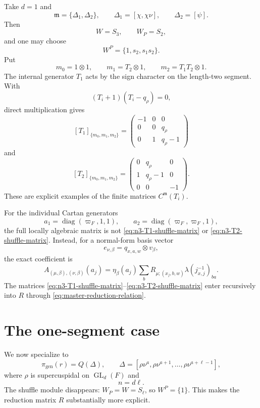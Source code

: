 \documentclass[12pt]{article}
\theoremstyle{definition}
\theoremstyle{remark}
\DeclareMathOperator{\GL}{GL}
\begin{document}
Take \(d=1\) and
\[
 \mathfrak m=\{\Delta_1,\Delta_2\},
 \qquad
 \Delta_1=[\chi,\chi\nu],
 \qquad
 \Delta_2=[\psi].
\]
Then
\[
 W=S_3,
 \qquad
 W_P=S_2,
\]
and one may choose
\[
 W^P=\{1,s_2,s_1s_2\}.
\]
Put
\[
 m_0=1\otimes1,
 \qquad
 m_1=T_2\otimes1,
 \qquad
 m_2=T_1T_2\otimes1.
\]
The internal generator \(T_1\) acts by the sign character on the length-two
segment.  With
\[
 (T_i+1)(T_i-q_\rho)=0,
\]
direct multiplication gives
\begin{equation}\label{eq:n3-T1-shuffle-matrix}
 [T_1]_{\{m_0,m_1,m_2\}}
 =
 \begin{pmatrix}
 -1&0&0\\
 0&0&q_\rho\\
 0&1&q_\rho-1
 \end{pmatrix}
\end{equation}
and
\begin{equation}\label{eq:n3-T2-shuffle-matrix}
 [T_2]_{\{m_0,m_1,m_2\}}
 =
 \begin{pmatrix}
 0&q_\rho&0\\
 1&q_\rho-1&0\\
 0&0&-1
 \end{pmatrix}.
\end{equation}
These are explicit examples of the finite matrices
\(C^{\mathfrak m}(T_i)\).

For the individual Cartan generators
\[
 a_1=\operatorname{diag}(\varpi_F,1,1),
 \qquad
 a_2=\operatorname{diag}(\varpi_F,\varpi_F,1),
\]
the full locally algebraic matrix is not
\eqref{eq:n3-T1-shuffle-matrix} or \eqref{eq:n3-T2-shuffle-matrix}.
Instead, for a normal-form basis vector
\[
 e_{\nu,\beta}
 =
 q_{x,a,w}\otimes v_\beta,
\]
the exact coefficient is
\begin{equation}\label{eq:n3-multisegment-exact-A}
 A_{(\mu,\beta),(\nu,\beta)}(a_j)
 =
 \eta_\beta(a_j)
 \sum_b
 R_{\mu;(x_j,b,w)}
 \lambda(j_{x,j}^{-1})_{ba}.
\end{equation}
The matrices \eqref{eq:n3-T1-shuffle-matrix}--\eqref{eq:n3-T2-shuffle-matrix}
enter recursively into \(R\) through
\eqref{eq:master-reduction-relation}.

\section{The one-segment case}
\label{sec:one-segment}

We now specialize to
\[
 \pi_{\mathrm{gen}}(r)=Q(\Delta),
 \qquad
 \Delta=
 [\rho\nu^a,\rho\nu^{a+1},\ldots,\rho\nu^{a+\ell-1}],
\]
where \(\rho\) is supercuspidal on \(\GL_d(F)\) and
\[
 n=d\ell.
\]
The shuffle module disappears: \(W_P=W=S_\ell\), so \(W^P=\{1\}\).
This makes the reduction matrix \(R\) substantially more explicit.
\end{document}
